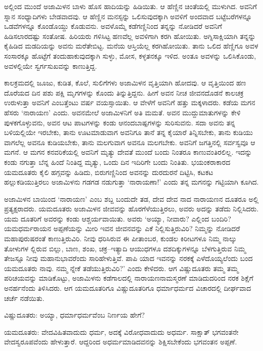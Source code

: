 ಅಲ್ಲಿಂದ ಮುಂದೆ ಅಜಾಮಿಳನ ಬಾಳು ಹೊಸ ಹಾದಿಯನ್ನು ಹಿಡಿಯಿತು. ಆ ಹೆಣ್ಣಿನ ಚಿಂತೆಯಲ್ಲಿ ಮುಳುಗಿದ. ಅವನಿಗೆ ಸ್ನಾನ ಸಂಧ್ಯಾದಿಗಳು ಬೇಡವಾದವು. ಆ ಹೆಣ್ಣಿನ ಮನಸ್ಸನ್ನು ಒಲಿಸುವುದಕ್ಕಾಗಿ ಅವಳಿಗೆ ಅಂದವಾದ ಬಟ್ಟೆಬರೆಗಳನ್ನೂ ಒಡವೆಗಳನ್ನೂ ಕೊಂಡೊಯ್ದು ಕೊಡುವನು. ಅವಳೊಮ್ಮೆ ಕಡೆಗಣ್ಣಿನಿಂದ ತನ್ನನ್ನು ನೋಡಿದರೆ ಅವನಿಗೆ ಹಿಡಿಸಲಾರದಷ್ಟು ಸಂತೋಷ. ಹಿರಿಯರು ಗಳಿಸಿಟ್ಟ ಹಣವೆಲ್ಲ ಅವಳಿಗಾಗಿ ಕರಗಿ ಹೋಯಿತು. ಅಗ್ನಿಸಾಕ್ಷಿಯಾಗಿ ತನ್ನನ್ನು ಕೈಹಿಡಿದ ಮಡದಿಯನ್ನು ಅವನು ಮರೆತೇಬಿಟ್ಟ. ಮನೆಯ ಆಸ್ತಿಯೆಲ್ಲ ಕರಗಿಹೋಯಿತು. ತಾನು ಒಲಿದ ಹೆಣ್ಣಿಗೂ ಅವಳ ಸಂಸಾರಕ್ಕೂ ಹೊಟ್ಟೆಗೆ ತಂದುಹಾಕುವುದಕ್ಕಾಗಿ ಸುಳ್ಳು, ಮೋಸ, ಕಳ್ಳತನಕ್ಕೂ ಇಳಿದ. ಅಂತೂ ಅವಳನ್ನು ಒಲಿಸಿಕೊಂಡು, ಅವಳಲ್ಲಿಯೇ ಸ್ವರ್ಗಸುಖವನ್ನು ಕಾಣುತ್ತಿದ್ದ. 

ಕಾಲಕ್ರಮದಲ್ಲಿ ಜೂಜು, ಕುಡಿತ, ಕೊಲೆ, ಸುಲಿಗೆಗಳು ಅಜಾಮಿಳನ ವೃತ್ತಿಯಾಗಿ ಹೋದವು. ಆ ವೃತ್ತಿಯಿಂದ ಹಣ ದೊರೆಯದ ದಿನ ಪಶು ಪಕ್ಷಿ ಮೃಗಗಳನ್ನು ಕೊಂದು ತಿನ್ನುತ್ತಿದ್ದನು. ಹೀಗೆ ಅವನ ನೀಚ ಜೀವನದೊಡನೆ ಕಾಲಚಕ್ರ ಉರುಳುತ್ತಾ ಅವನಿಗೆ ಎಂಬತ್ತೆಂಟು ವರ್ಷ ವಯಸ್ಸಾಯಿತು. ಆ ವೇಳೆಗೆ ಅವನಿಗೆ ಹತ್ತು ಮಕ್ಕಳಾದರು. ಕಡೆಯ ಮಗನ ಹೆಸರು ‘ನಾರಾಯಣ’ ಎಂದು. ಅವನಮೇಲೆ ಅಜಾಮಿಳನಿಗೆ ಅತಿ ಮಮತೆ. ಅವನ ಮುದ್ದುಮಾತುಗಳನ್ನು ಕೇಳಿ ಪುಳಕಗೊಳ್ಳುವನು, ಅವನ ಆಟ ಪಾಟಗಳನ್ನು ಕಂಡು ಆನಂದಬಾಷ್ಪಗಳನ್ನು ಸುರಿಸುವನು. ಸದಾ ಅವನು ತನ್ನ ಬಳಿಯಲ್ಲಿಯೇ ಇರಬೇಕು, ತಾನು ಊಟಮಾಡುವಾಗ ಅವನಿಗೂ ತಾನೆ ತನ್ನ ಕೈಯಾರೆ ತಿನ್ನಿಸಬೇಕು, ತಾನು ಕುಡಿಯು ವಾಗಲೆಲ್ಲ ಅವನೂ ಕುಡಿಯಬೇಕು, ತಾನು ಮಲಗುವಾಗ ಅವನೂ ಮಲಗಬೇಕು. ಅವನಿಗೆ ಜಗತ್ತಿನಲ್ಲಿ ಸರ್ವಸ್ವವೂ ಆ ಮಗನೆ. ಆ ಮಗನ ಕನವರಿಕೆಯಲ್ಲಿ ಅವನಿಗೆ ಮೃತ್ಯು ದೇವತೆ ಮುಂದೆ ಬಂದು ನಿಂತರೂ ಕಾಣುವಂತಿರಲಿಲ್ಲ. ಇದನ್ನು ಕಂಡು ನಗುತ್ತಾ ಬೆನ್ನ ಹಿಂದೆ ನಿಂತಿದ್ದ ಮೃತ್ಯು, ಒಂದು ದಿನ ಇದಿರಿಗೇ ಬಂದು ನಿಂತಿತು. ಭಯಂಕರಾಕಾರದ ಯಮದೂತರು ಕೈಲಿ ಹಗ್ಗವನ್ನು ಹಿಡಿದು, ಬಿರುಗಣ್ಣಿನಿಂದ ಅವನನ್ನು ದುರದುರನೆ ದಿಟ್ಟಿಸಿ, ಕಟಕಟ ಹಲ್ಲುಕಡಿಯುತ್ತಿರಲು ಅಜಾಮಿಳನು ಗಡಗಡ ನಡುಗುತ್ತಾ ‘ನಾರಾಯಣಾ!’ ಎಂದು ತನ್ನ ಮಗನನ್ನು ಗಟ್ಟಿಯಾಗಿ ಕೂಗಿದ.

ಅಜಾಮಿಳನ ಬಾಯಿಂದ ‘ನಾರಾಯಣ’ ಎಂಬ ಶಬ್ದ ಬಂದುದೇ ತಡ, ದೇವ ದೇವ ನಾದ ನಾರಾಯಣನ ದೂತರೂ ಅಲ್ಲಿ ಪ್ರತ್ಯಕ್ಷರಾದರು. ಯಮದೂತರು ಅಜಾಮಿಳನ ಜೀವವನ್ನು ಹೊರಗೆಳೆಯುತ್ತಿರಲು, ಅವರು ಅದನ್ನು ತಡೆದು ನಿಲ್ಲಿಸಿದರು. ಯಮ ದೂತರಿಗೆ ಅವರನ್ನು ಕಂಡು ಆಶ್ಚರ್ಯವಾಯಿತು. ಅವರು ‘ಅಯ್ಯಾ, ನೀವಾರು? ಎಲ್ಲಿಂದ ಬಂದಿರಿ? ಯಮಧರ್ಮರಾಯನ ಅಪ್ಪಣೆಯನ್ನು ಮೀರಿ ಇವನ ಜೀವನವನ್ನು ಎಕೆ ನಿಲ್ಲಿಸುತ್ತಿರುವಿರಿ? ನಿಮ್ಮನ್ನು ನೋಡಿದರೆ ಮಹಾಪುರುಷರಂತೆ ಕಾಣುತ್ತಿರುವಿರಿ. ನೀವು ಧರಿಸಿರುವ ಈ ಪೀತಾಂಬರ, ಕುಂಡಲ ಕಿರೀಟಗಳೂ ನಿಮ್ಮ ನಾಲ್ಕು ತೋಳುಗಳ ಲ್ಲಿರುವ ಬಿಲ್ಲು, ಬಾಣ, ಶಂಖ, ಚಕ್ರ–ಇತ್ಯಾದಿ ಆಯುಧಗಳೂ ದಶದಿಕ್ಕುಗಳನ್ನೂ ಬೆಳಗುತ್ತಿರುವ ನಿಮ್ಮ ತೇಜಸ್ಸೂ ನೀವು ಮಹಾನುಭಾವರೆಂದು ಸಾರಿಹೇಳುತ್ತಿವೆ. ಪಾಪಿ ಯಾದ ಇವನನ್ನು ನರಕಕ್ಕೆ ಎಳೆದೊಯ್ಯಲೆಂದು ಬಂದ ಯಮದೂತರು ನಾವು. ನಮ್ಮ ನ್ನೇಕೆ ತಡೆಯುತ್ತಿರುವಿರಿ?’ ಎಂದು ಕೇಳಿದರು. ಆಗ ವಿಷ್ಣುದೂತರು ತಮ್ಮ ತಮ್ಮ ಪರಿಚಯವನ್ನು ಮಾಡಿಕೊಟ್ಟು, ಅಜಾಮಿಳನು ಕಡೆಗಾಲದಲ್ಲಿ ನಾರಾಯಣನಾಮಸ್ಮರಣೆ ಮಾಡಿದುದರಿಂದ ನರಕ ಶಿಕ್ಷೆಗೆ ಅನರ್ಹನೆಂದು ತಿಳಿಸಿದರು. ಆಗ ಯಮದೂತರಿಗೂ ವಿಷ್ಣುದೂತರಿಗೂ ಧರ್ಮಾಧರ್ಮದ ವಿಚಾರದಲ್ಲಿ ದೀರ್ಘವಾದ ಚರ್ಚೆ ನಡೆಯಿತು.

ವಿಷ್ಣುದೂತರು: ಅಯ್ಯಾ, ಧರ್ಮಾಧರ್ಮವೆಂಬ ನಿರ್ಣಯ ಹೇಗೆ?

ಯಮದೂತರು: ವೇದವಿಹಿತವಾದುದು ಧರ್ಮ, ಅದಕ್ಕೆ ವಿರೋಧವಾದುದು ಅಧರ್ಮ. ಸಾಕ್ಷಾತ್ ಭಗವಂತನೇ ವೇದಸ್ವರೂಪವೆಂದು ಹೇಳುತ್ತಾರೆ. ಆದ್ದರಿಂದ ಅಧರ್ಮಮಾಡಿದವನನ್ನು ಶಿಕ್ಷಿಸಬೇಕೆಂದು ಭಗವಂತನ ಅಪ್ಪಣೆ.

